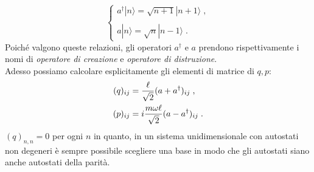 \documentclass[12pt,a4paper]{report}
\theoremstyle{definition}
\numberwithin{equation}{section}
\newcommand{\ket}{\rangle}
\newcommand{\adj}[1]{#1^{\dagger}}
\begin{document}
\begin{equation}
\begin{cases}
\adj{a}|n\ket=\sqrt{n+1}|n+1\ket\;, \\
\\
a|n\ket=\sqrt{n}|n-1\ket\;.
\end{cases}
\end{equation}
Poiché valgono queste relazioni, gli operatori $\adj{a}$ e $a$ prendono rispettivamente i nomi di \textit{operatore di creazione} e \textit{operatore di distruzione}. \\
Adesso possiamo calcolare esplicitamente gli elementi di matrice di $q,p$:
\begin{align}
(q)_{ij}&=\frac{\ell}{\sqrt{2}}(a+\adj{a})_{ij}\;, \notag \\
(p)_{ij} &= i\frac{m\omega\ell}{\sqrt{2}}(a-\adj{a})_{ij}\;.
\end{align}
$(q)_{n,n}=0$ per ogni $n$ in quanto, in un sistema unidimensionale con autostati non degeneri è sempre possibile scegliere una base in modo che gli autostati siano anche autostati della parità.
\end{document}
